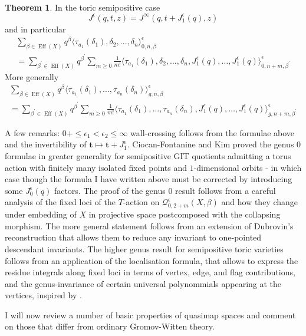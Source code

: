 \documentclass[11pt]{amsart}
\newcommand{\Qe}[4]{\mathcal{Q}^{\epsilon}_{#1,#2}(#3,#4)}
\theoremstyle{definition}
\newtheorem{thm}{Theorem}[section]
\theoremstyle{definition}
\begin{document}
\begin{thm}\label{thm:wcf}
 In the toric semipositive case \cite[Theorem 1.2.2]{CF-K-wallcrossing}
 \[ J^\epsilon(q,t,z)=J^\infty(q,t+J^\epsilon_1(q),z)\]
 and in particular
 \begin{multline*} \sum_{\beta\in\operatorname{Eff}(X)}q^\beta\langle\tau_{a_1}(\delta_1),\delta_2,\ldots,\delta_n\rangle^\epsilon_{0,n,\beta} \\ =\sum_{\beta^\prime\in\operatorname{Eff}(X)}q^{\beta^\prime}\sum_{m\geq 0}\frac{1}{m!}\langle\tau_{a_1}(\delta_1),\delta_2,\ldots,\delta_n,J^\epsilon_1(q),\ldots,J^\epsilon_1(q)\rangle^\epsilon_{0,n+m,\beta^\prime}\end{multline*}
 More generally \cite[Theorem 1.3.2]{CF-K-higher-genus}
 \begin{multline*} \sum_{\beta\in\operatorname{Eff}(X)}q^\beta\langle\tau_{a_1}(\delta_1),\ldots,\tau_{a_n}(\delta_n)\rangle^\epsilon_{g,n,\beta} \\ =\sum_{\beta^\prime\in\operatorname{Eff}(X)}q^{\beta^\prime}\sum_{m\geq 0}\frac{1}{m!}\langle\tau_{a_1}(\delta_1),\ldots,\tau_{a_n}(\delta_n),J^\epsilon_1(q),\ldots,J^\epsilon_1(q)\rangle^\epsilon_{g,n+m,\beta^\prime}\end{multline*}
\end{thm}
A few remarks: $0+\leq \epsilon_1<\epsilon_2\leq\infty$ wall-crossing follows from the formulae above and the invertibility of $\mathbf t\mapsto \mathbf t+J^\epsilon_1$. Ciocan-Fontanine and Kim proved the genus $0$ formulae in greater generality for semipositive GIT quotients admitting a torus action with finitely many isolated fixed points and $1$-dimensional orbits - in which case though the formula I have written above must be corrected by introducing some $J^\epsilon_0(q)$ factors. The proof of the genus $0$ result follows from a careful analysis of the fixed loci of the $T$-action on $\Qe{0}{2+m}{X}{\beta}$ and how they change under embedding of $X$ in projective space postcomposed with the collapsing morphism. The more general statement follows from an extension of Dubrovin's reconstruction that allows them to reduce any invariant to one-pointed descendant invariants. The higher genus result for semipositive toric varieties follows from an application of the localisation formula, that allows to express the residue integrals along fixed loci in terms of vertex, edge, and flag contributions, and the genus-invariance of certain universal polynommials appearing at the vertices, inspired by \cite{MOP}.

\smallskip
I will now review a number of basic properties of quasimap spaces and comment on those that differ from ordinary Gromov-Witten theory.
\end{document}
